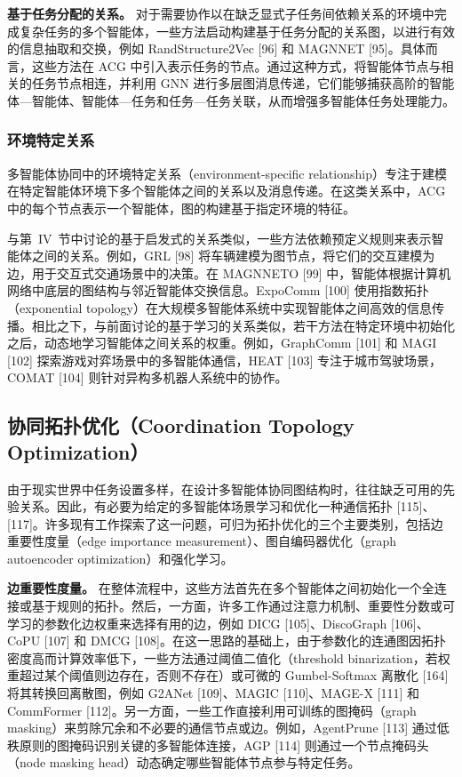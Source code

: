 \documentclass[10pt,UTF8,fontset=fandol]{ctexart}
\begin{document}
\textbf{基于任务分配的关系。} 对于需要协作以在缺乏显式子任务间依赖关系的环境中完成复杂任务的多个智能体，一些方法启动构建基于任务分配的关系图，以进行有效的信息抽取和交换，例如 RandStructure2Vec [96] 和 MAGNNET [95]。具体而言，这些方法在 ACG 中引入表示任务的节点。通过这种方式，将智能体节点与相关的任务节点相连，并利用 GNN 进行多层图消息传递，它们能够捕获高阶的智能体—智能体、智能体—任务和任务—任务关联，从而增强多智能体任务处理能力。

\subsubsection{环境特定关系}
多智能体协同中的环境特定关系（environment-specific relationship）专注于建模在特定智能体环境下多个智能体之间的关系以及消息传递。在这类关系中，ACG 中的每个节点表示一个智能体，图的构建基于指定环境的特征。

与第~IV~节中讨论的基于启发式的关系类似，一些方法依赖预定义规则来表示智能体之间的关系。例如，GRL [98] 将车辆建模为图节点，将它们的交互建模为边，用于交互式交通场景中的决策。在 MAGNNETO [99] 中，智能体根据计算机网络中底层的图结构与邻近智能体交换信息。ExpoComm [100] 使用指数拓扑（exponential topology）在大规模多智能体系统中实现智能体之间高效的信息传播。相比之下，与前面讨论的基于学习的关系类似，若干方法在特定环境中初始化之后，动态地学习智能体之间关系的权重。例如，GraphComm [101] 和 MAGI [102] 探索游戏对弈场景中的多智能体通信，HEAT [103] 专注于城市驾驶场景，COMAT [104] 则针对异构多机器人系统中的协作。

\subsection{协同拓扑优化（Coordination Topology Optimization）}

由于现实世界中任务设置多样，在设计多智能体协同图结构时，往往缺乏可用的先验关系。因此，有必要为给定的多智能体场景学习和优化一种通信拓扑 [115]、[117]。许多现有工作探索了这一问题，可归为拓扑优化的三个主要类别，包括边重要性度量（edge importance measurement）、图自编码器优化（graph autoencoder optimization）和强化学习。

\textbf{边重要性度量。} 在整体流程中，这些方法首先在多个智能体之间初始化一个全连接或基于规则的拓扑。然后，一方面，许多工作通过注意力机制、重要性分数或可学习的参数化边权重来选择有用的边，例如 DICG [105]、DiscoGraph [106]、CoPU [107] 和 DMCG [108]。在这一思路的基础上，由于参数化的连通图因拓扑密度高而计算效率低下，一些方法通过阈值二值化（threshold binarization，若权重超过某个阈值则边存在，否则不存在）或可微的 Gumbel-Softmax 离散化 [164] 将其转换回离散图，例如 G2ANet [109]、MAGIC [110]、MAGE-X [111] 和 CommFormer [112]。另一方面，一些工作直接利用可训练的图掩码（graph masking）来剪除冗余和不必要的通信节点或边。例如，AgentPrune [113] 通过低秩原则的图掩码识别关键的多智能体连接，AGP [114] 则通过一个节点掩码头（node masking head）动态确定哪些智能体节点参与特定任务。
\end{document}
